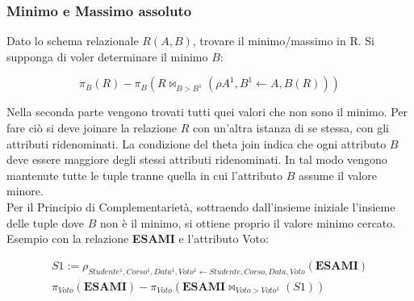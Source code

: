 \subsubsection{Minimo e Massimo assoluto}

Dato lo schema relazionale $R(A,B)$, trovare il minimo/massimo in R.
Si supponga di voler determinare il minimo $B$:

\begin{displaymath}
  \pi_{B}(R) - \pi_{B}(R \bowtie_{B>B^1}(\rho{A^1,B^1 \leftarrow A,B}(R)))
\end{displaymath}

Nella seconda parte vengono trovati tutti quei valori che non sono il minimo.
Per fare ciò si deve joinare la relazione $R$ con un'altra istanza di se stessa,
con gli attributi ridenominati. La condizione del theta join indica che ogni attributo
$B$ deve essere maggiore degli stessi attributi ridenominati. In tal modo vengono
mantenute tutte le tuple tranne quella in cui l'attributo $B$ assume il valore minore. \\

\noindent
Per il Principio di Complementarietà, sottraendo dall'insieme iniziale l'insieme delle
tuple dove $B$ non è il minimo, si ottiene proprio il valore minimo cercato. \\

\noindent
Esempio con la relazione \textbf{ESAMI} e l'attributo Voto:

\begin{gather*}
  S1 := \rho_{Studente^1,Corso^1,Data^1,Voto^1 \leftarrow Studente,Corso,Data,Voto}(\textbf{ESAMI}) \\
  \pi_{Voto}(\textbf{ESAMI}) - \pi_{Voto}(\textbf{ESAMI} \bowtie_{Voto>Voto^1}(S1))
\end{gather*}